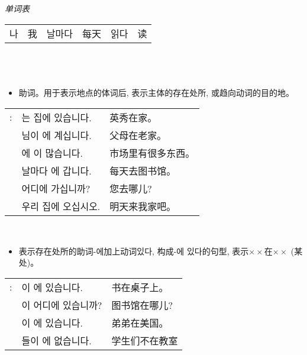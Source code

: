 \noindent \textit{单词表}\\

\begin{tabular}{ll|ll|ll}
	\kr 나 & 我 & \kr 날마다 & 每天 & \kr 읽다 & 读
\end{tabular}\\
\section{\kr{}}
\begin{grammar}
	\begin{grammarsect}[\kr -에]
		\begin{itemize}
			\item 助词。用于表示地点的体词后, 表示主体的存在处所, 或趋向动词的目的地。
		\end{itemize}
		\begin{tabular}{lll}
			\kr\ruby{例}{예}: & \kr\ruby{英秀}{영수}는 집에 있습니다.              & 英秀在家。     \\
			                & \kr\ruby{父母}{부모}님이 \ruby{故鄕}{고향}에 계십니다. & 父母在老家。    \\
			                & \kr\ruby{市場}{시장}에 \ruby{物件}{물건}이 많습니다.  & 市场里有很多东西。 \\
			                & \kr 날마다 \ruby{圖書館}{도서관}에 갑니다.           & 每天去图书馆。   \\
			                & \kr 어디에 가십니까?                           & 您去哪儿?     \\
			                & \kr\ruby{來日}{내일} 우리 집에 오십시오.            & 明天来我家吧。
		\end{tabular}\\
		\begin{itemize}
			\item 表示存在处所的助词{\kr-에}加上动词{\kr 있다}, 构成{\kr -에 있다}的句型, 表示$\times \times$在$\times \times$ (某处)。
		\end{itemize}
		\begin{tabular}{lll}
			\kr \ruby{例}{예}: & \kr \ruby{冊}{책}이 \ruby{冊床}{책상}에 있습니다.    & 书在桌子上。  \\
			                 & \kr \ruby{圖書館}{도서관}이 어디에 있습니까?           & 图书馆在哪儿? \\
			                 & \kr \ruby{同生}{동생}이 \ruby{美國}{미국}에 있습니다.  & 弟弟在美国。  \\
			                 & \kr \ruby{學生}{학생}들이 \ruby{敎室}{교실}에 없습니다. & 学生们不在教室 \\

\end{tabular}
\end{grammarsect}
\end{grammar}
